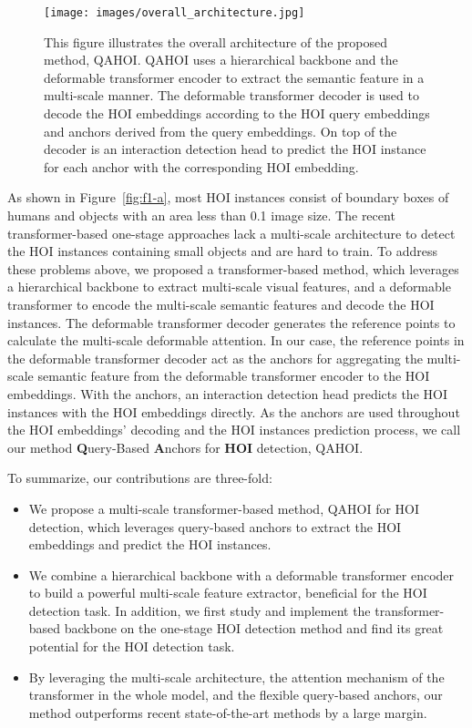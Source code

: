 \documentclass[10pt,twocolumn,letterpaper]{article}
\begin{document}
\begin{figure*}
  \centering
  \texttt{[image: images/overall\_architecture.jpg]}
  \caption{This figure illustrates the overall architecture of the proposed method, QAHOI.
     QAHOI uses a hierarchical backbone and the deformable transformer encoder to extract the semantic feature in a multi-scale manner.
     The deformable transformer decoder is used to decode the HOI embeddings according to the HOI query embeddings and anchors derived from the query embeddings.
     On top of the decoder is an interaction detection head to predict the HOI instance for each anchor with the corresponding HOI embedding.}
  \label{fig:overall}
\end{figure*}
As shown in Figure~\ref{fig:f1-a}, most HOI instances consist of boundary boxes of humans and objects with an area less than 0.1 image size.
The recent transformer-based one-stage approaches lack a multi-scale architecture to detect the HOI instances containing small objects and are hard to train.
To address these problems above, we proposed a transformer-based method, which leverages a hierarchical backbone to extract multi-scale visual features, and a deformable transformer \cite{zhu2020deformable} to encode the multi-scale semantic features and decode the HOI instances.
The deformable transformer decoder generates the reference points to calculate the multi-scale deformable attention. 
In our case, the reference points in the deformable transformer decoder act as the anchors for aggregating the multi-scale semantic feature from the deformable transformer encoder to the HOI embeddings. With the anchors, an interaction detection head predicts the HOI instances with the HOI embeddings directly.
As the anchors are used throughout the HOI embeddings' decoding and the HOI instances prediction process, we call our method {\bf Q}uery-Based {\bf A}nchors for {\bf HOI} detection, QAHOI.

To summarize, our contributions are three-fold:
\begin{itemize}
  \item We propose a multi-scale transformer-based method, QAHOI for HOI detection, which leverages query-based anchors to extract the HOI embeddings and predict the HOI instances.
  \item We combine a hierarchical backbone with a deformable transformer encoder to build a powerful multi-scale feature extractor, beneficial for the HOI detection task. In addition, we first study and implement the transformer-based backbone on the one-stage HOI detection method and find its great potential for the HOI detection task.
  \item By leveraging the multi-scale architecture, the attention mechanism of the transformer in the whole model, and the flexible query-based anchors, our method outperforms recent state-of-the-art methods by a large margin.
\end{itemize}
\end{document}

